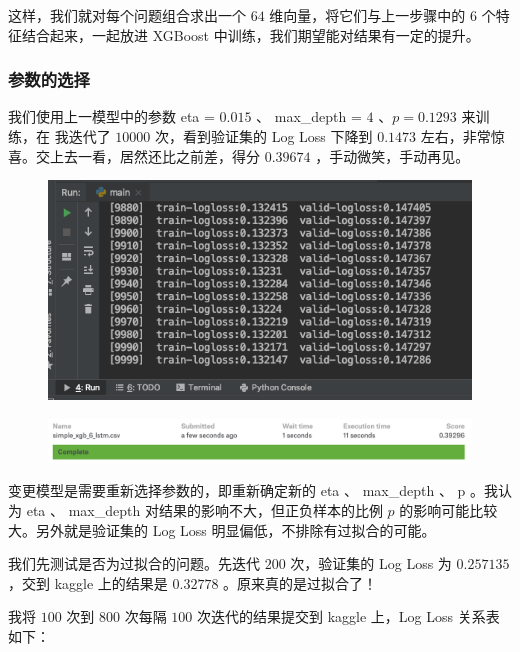 \documentclass{article}
\begin{document}
这样，我们就对每个问题组合求出一个 $64$ 维向量，将它们与上一步骤中的 $6$ 个特征结合起来，一起放进 XGBoost 中训练，我们期望能对结果有一定的提升。

\subsubsection{参数的选择}

我们使用上一模型中的参数 eta = $0.015$ 、 max\_depth = $4$ 、$p = 0.1293$ 来训练，在 我迭代了 $10000$ 次，看到验证集的 Log Loss 下降到 $0.1473$ 左右，非常惊喜。交上去一看，居然还比之前差，得分 $0.39674$ ，手动微笑，手动再见。

\begin{figure}[!h]
\centering
\includegraphics[scale=0.5]{tu9.png}
\end{figure}

\begin{figure}[!h]
\centering
\includegraphics[scale=0.4]{tu10.png}
\end{figure}

变更模型是需要重新选择参数的，即重新确定新的 eta 、 max\_depth 、 p 。我认为 eta 、 max\_depth 对结果的影响不大，但正负样本的比例 $p$ 的影响可能比较大。另外就是验证集的 Log Loss 明显偏低，不排除有过拟合的可能。

我们先测试是否为过拟合的问题。先迭代 $200$ 次，验证集的 Log Loss 为 $0.257135$ ，交到 kaggle 上的结果是 $0.32778$ 。原来真的是过拟合了！

我将 $100$ 次到 $800$ 次每隔 $100$ 次迭代的结果提交到 kaggle 上，Log Loss 关系表如下：
\end{document}
